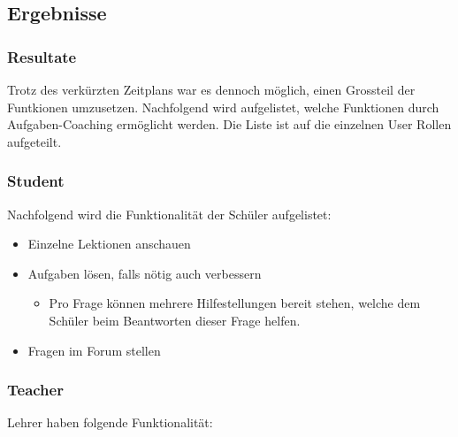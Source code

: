 \newpage
\subsection{Ergebnisse}

\subsubsection{Resultate}
Trotz des verkürzten Zeitplans war es dennoch möglich, einen Grossteil der Funtkionen umzusetzen. Nachfolgend wird aufgelistet, welche Funktionen durch Aufgaben-Coaching ermöglicht werden. Die Liste ist auf die einzelnen User Rollen aufgeteilt.

\subsubsection*{Student}
Nachfolgend wird die Funktionalität der Schüler aufgelistet:

\begin{itemize}
	\item Einzelne Lektionen anschauen
	\item Aufgaben lösen, falls nötig auch verbessern
	\begin{itemize}
		\item Pro Frage können mehrere Hilfestellungen bereit stehen, welche dem Schüler beim Beantworten dieser Frage helfen.
	\end{itemize}
	\item Fragen im Forum stellen
\end{itemize}

\subsubsection*{Teacher}
Lehrer haben folgende Funktionalität:

